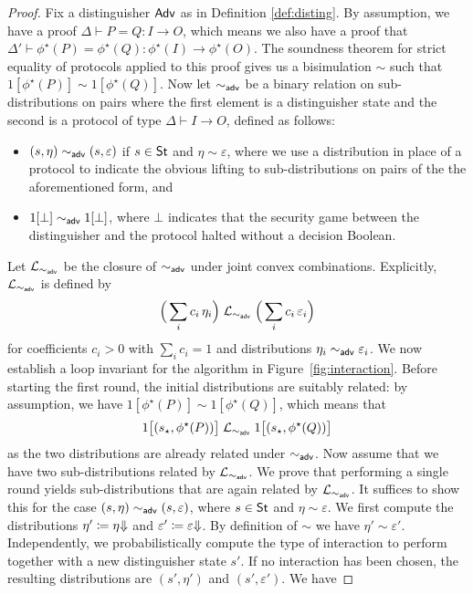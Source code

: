 \begin{proof}
Fix a distinguisher $\mathsf{Adv}$ as in Definition \ref{def:disting}. By assumption, we have a proof $\Delta \vdash P = Q : I \to O$, which means we also have a proof that $\Delta' \vdash \phi^\star(P) = \phi^\star(Q) : \phi^\star(I) \to \phi^\star(O)$. The soundness theorem for strict equality of protocols applied to this proof gives us a bisimulation $\sim$ such that $1[\phi^\star(P)] \sim 1[\phi^\star(Q)]$. Now let $\sim_{\mathsf{adv}}$ be a binary relation on sub-distributions on pairs where the first element is a distinguisher state and the second is a protocol of type $\Delta \vdash I \to O$, defined as follows:
\begin{itemize}
\item $(s,\eta) \sim_{\mathsf{adv}} (s,\varepsilon)$ if $s \in \mathsf{St}$ and $\eta \sim \varepsilon$, where we use a distribution in place of a protocol to indicate the obvious lifting to sub-distributions on pairs of the the aforementioned form, and
\item $1[\bot] \sim_{\mathsf{adv}} 1[\bot]$, where $\bot$ indicates that the security game between the distinguisher and the protocol halted without a decision Boolean.
\end{itemize}
Let $\mathcal{L}_{\sim_{\mathsf{adv}}}$ be the closure of $\sim_{\mathsf{adv}}$ under joint convex combinations. Explicitly, $\mathcal{L}_{\sim_{\mathsf{adv}}}$ is defined by
\[\Big(\sum_i c_i \, \eta_i\Big) \; \mathcal{L}_{\sim_{\mathsf{adv}}} \; \Big(\sum_i c_i \, \varepsilon_i\Big)\]
for coefficients $c_i > 0$ with $\sum_i c_i = 1$ and distributions $\eta_i \sim_{\mathsf{adv}} \varepsilon_i$. We now establish a loop invariant for the algorithm in Figure~\ref{fig:interaction}. Before starting the first round, the initial distributions are suitably related: by assumption, we have $1[\phi^\star(P)] \sim 1[\phi^\star(Q)]$, which means that
\[1\big[(s_\star,\phi^\star(P))\big] \; \mathcal{L}_{\sim_{\mathsf{adv}}} \; 1\big[(s_\star,\phi^\star(Q))\big]\]
as the two distributions are already related under $\sim_{\mathsf{adv}}$. Now assume that we have two sub-distributions related by $\mathcal{L}_{\sim_{\mathsf{adv}}}$. We prove that performing a single round yields sub-distributions that are again related by $\mathcal{L}_{\sim_{\mathsf{adv}}}$. It suffices to show this for the case $(s,\eta) \sim_{\mathsf{adv}} (s,\varepsilon)$, where $s \in \mathsf{St}$ and $\eta \sim \varepsilon$. We first compute the distributions $\eta' \coloneqq {\eta \hspace{-2.5pt} \Downarrow}$ and $\varepsilon' \coloneqq {\varepsilon \hspace{-2.5pt} \Downarrow}$. By definition of $\sim$ we have $\eta' \sim \varepsilon'$. Independently, we probabilistically compute the type of interaction to perform together with a new distinguisher state $s'$. If no interaction has been chosen, the resulting distributions are $(s',\eta')$ and $(s',\varepsilon')$. We have

\end{proof}
